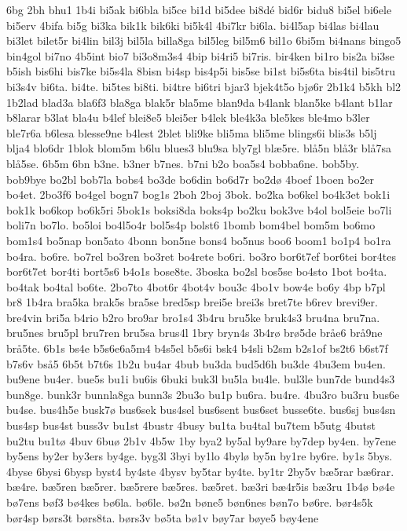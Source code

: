 {6bg
2bh
bhu1
1b4i
bi5ak
bi6bla
bi5ce
bi1d
bi5dee
bi8dé
bid6r
bidu8
bi5el
bi6ele
bi5erv
4bifa
bi5g
bi3ka
bik1k
bik6ki
bi5k4l
4bi7kr
bi6la.
bi4l5ap
bi4las
bi4lau
bi3let
bilet5r
bi4lin
bil3j
bil5la
billa8ga
bil5leg
bil5m6
bil1o
6bi5m
bi4nans
bingo5
bin4gol
bi7no
4b5int
bio7
bi3o8m3s4
4bip
bi4ri5
bi7ris.
bir4ken
bi1ro
bis2a
bi3se
b5ish
bis6hi
bis7ke
bi5s4la
8bisn
bi4sp
bis4p5i
bis5se
bi1st
bi5s6ta
bis4til
bis5tru
bi3s4v
bi6ta.
bi4te.
bi5tes
bi8ti.
bi4tre
bi6tri
bjar3
bjek4t5o
bjø6r
2b1k4
b5kh
bl2
1b2lad
blad3a
bla6f3
bla8ga
blak5r
bla5me
blan9da
b4lank
blan5ke
b4lant
b1lar
b8larar
b3lat
bla4u
b4lef
blei8e5
blei5er
b4lek
ble4k3a
ble5kes
ble4mo
b3ler
ble7r6a
b6lesa
blesse9ne
b4lest
2blet
bli9ke
bli5ma
bli5me
blings6i
blis3s
b5lj
blja4
blo6dr
1blok
blom5m
b6lu
blues3
blu9sa
bly7gl
blæ5re.
blå5n
blå3r
blå7sa
blå5se.
6b5m
6bn
b3ne.
b3ner
b7nes.
b7ni
b2o
boa5s4
bobba6ne.
bob5by.
bob9bye
bo2bl
bob7la
bobs4
bo3de
bo6din
bo6d7r
bo2dø
4boef
1boen
bo2er
bo4et.
2bo3f6
bo4gel
bogn7
bog1s
2boh
2boj
3bok.
bo2ka
bo6kel
bo4k3et
bok1i
bok1k
bo6kop
bo6k5ri
5bok1s
boksi8da
boks4p
bo2ku
bok3ve
b4ol
bol5eie
bo7li
boli7n
bo7lo.
bo5loi
bo4l5o4r
bol5s4p
bolst6
1bomb
bom4bel
bom5m
bo6mo
bom1s4
bo5nap
bon5ato
4bonn
bon5ne
bons4
bo5nus
boo6
boom1
bo1p4
bo1ra
bo4ra.
bo6re.
bo7rel
bo3ren
bo3ret
bo4rete
bo6ri.
bo3ro
bor6t7ef
bor6tei
bor4tes
bor6t7et
bor4ti
bort5s6
b4o1s
bose8te.
3boska
bo2sl
bos5se
bo4sto
1bot
bo4ta.
bo4tak
bo4tal
bo6te.
2bo7to
4bot6r
4bot4v
bou3c
4bo1v
bow4e
bo6y
4bp
b7pl
br8
1b4ra
bra5ka
brak5s
bra5se
bred5sp
brei5e
brei3s
bret7te
b6rev
brevi9er.
bre4vin
bri5a
b4rio
b2ro
bro9ar
bro1s4
3b4ru
bru5ke
bruk4s3
bru4na
bru7na.
bru5nes
bru5pl
bru7ren
bru5sa
brus4l
1bry
bryn4s
3b4rø
brø5de
bråe6
brå9ne
brå5te.
6b1s
bs4e
b5s6e6a5m4
b4s5el
b5s6i
bsk4
b4sli
b2sm
b2s1of
bs2t6
b6st7f
b7s6v
bså5
6b5t
b7t6s
1b2u
bu4ar
4bub
bu3da
bud5d6h
bu3de
4bu3em
bu4en.
bu9ene
bu4er.
bue5s
bu1i
bu6is
6buki
buk3l
bu5la
bu4le.
bul3le
bun7de
bund4s3
bun8ge.
bunk3r
bunnla8ga
bunn3s
2bu3o
bu1p
bu6ra.
bu4re.
4bu3ro
bu3ru
bus6e
bu4se.
bus4h5e
busk7ø
bus6sek
bus4sel
bus6sent
bus6set
busse6te.
bus6sj
bus4sn
bus4sp
bus4st
buss3v
bu1st
4bustr
4busy
bu1ta
bu4tal
bu7tem
b5utg
4butst
bu2tu
bu1tø
4buv
6buø
2b1v
4b5w
1by
bya2
by5al
by9are
by7dep
by4en.
by7ene
by5ens
by2er
by3ers
by4ge.
byg3l
3byi
by1lo
4bylø
by5n
by1re
by6re.
by1s
5bys.
4byse
6bysi
6bysp
byst4
by4ste
4bysv
by5tar
by4te.
by1tr
2by5v
bæ5rar
bæ6rar.
bæ4re.
bæ5ren
bæ5rer.
bæ5rere
bæ5res.
bæ5ret.
bæ3ri
bæ4r5is
bæ3ru
1b4ø
bø4e
bø7ens
bøf3
bø4kes
bø6la.
bø6le.
bø2n
bøne5
bøn6nes
bøn7o
bø6re.
bør4s5k
bør4sp
børs3t
børs8ta.
børs3v
bø5ta
bø1v
bøy7ar
bøye5
bøy4ene
}
